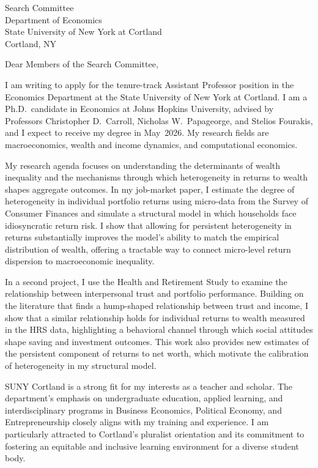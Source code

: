 \documentclass[11pt,letterpaper]{letter}
\begin{document}
\begin{letter}{Search Committee \\
Department of Economics \\
State University of New York at Cortland \\
Cortland, NY}

\opening{Dear Members of the Search Committee,}

I am writing to apply for the tenure-track Assistant Professor position in the Economics Department at the State University of New York at Cortland. I am a Ph.D.\ candidate in Economics at Johns Hopkins University, advised by Professors Christopher D.~Carroll, Nicholas W.~Papageorge, and Stelios Fourakis, and I expect to receive my degree in May~2026. My research fields are macroeconomics, wealth and income dynamics, and computational economics.

My research agenda focuses on understanding the determinants of wealth inequality and the mechanisms through which heterogeneity in returns to wealth shapes aggregate outcomes. In my job-market paper, I estimate the degree of heterogeneity in individual portfolio returns using micro-data from the Survey of Consumer Finances and simulate a structural model in which households face idiosyncratic return risk. I show that allowing for persistent heterogeneity in returns substantially improves the model’s ability to match the empirical distribution of wealth, offering a tractable way to connect micro-level return dispersion to macroeconomic inequality.

In a second project, I use the Health and Retirement Study to examine the relationship between interpersonal trust and portfolio performance. Building on the literature that finds a hump-shaped relationship between trust and income, I show that a similar relationship holds for individual returns to wealth measured in the HRS data, highlighting a behavioral channel through which social attitudes shape saving and investment outcomes. This work also provides new estimates of the persistent component of returns to net worth, which motivate the calibration of heterogeneity in my structural model.

SUNY Cortland is a strong fit for my interests as a teacher and scholar. The department’s emphasis on undergraduate education, applied learning, and interdisciplinary programs in Business Economics, Political Economy, and Entrepreneurship closely aligns with my training and experience. I am particularly attracted to Cortland’s pluralist orientation and its commitment to fostering an equitable and inclusive learning environment for a diverse student body.


\end{letter}
\end{document}
